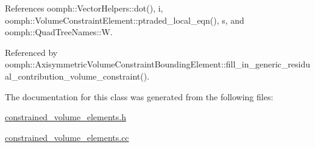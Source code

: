 References oomph\+::\+Vector\+Helpers\+::dot(), i, oomph\+::\+Volume\+Constraint\+Element\+::ptraded\+\_\+local\+\_\+eqn(), s, and oomph\+::\+Quad\+Tree\+Names\+::W.



Referenced by oomph\+::\+Axisymmetric\+Volume\+Constraint\+Bounding\+Element\+::fill\+\_\+in\+\_\+generic\+\_\+residual\+\_\+contribution\+\_\+volume\+\_\+constraint().



The documentation for this class was generated from the following files\+:\begin{DoxyCompactItemize}
\item 
\hyperlink{constrained__volume__elements_8h}{constrained\+\_\+volume\+\_\+elements.\+h}\item 
\hyperlink{constrained__volume__elements_8cc}{constrained\+\_\+volume\+\_\+elements.\+cc}\end{DoxyCompactItemize}
